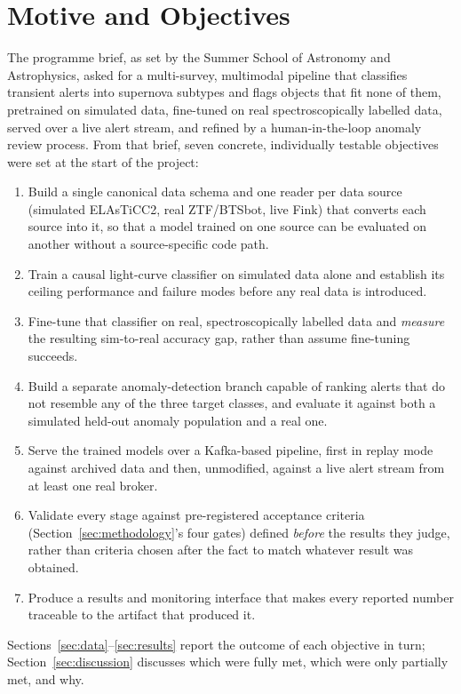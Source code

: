 \section{Motive and Objectives}
\label{sec:objectives}

The programme brief, as set by the Summer School of Astronomy and
Astrophysics, asked for a multi-survey, multimodal pipeline that classifies
transient alerts into supernova subtypes and flags objects that fit none of
them, pretrained on simulated data, fine-tuned on real spectroscopically
labelled data, served over a live alert stream, and refined by a
human-in-the-loop anomaly review process. From that brief, seven concrete,
individually testable objectives were set at the start of the project:

\begin{enumerate}
  \item Build a single canonical data schema and one reader per data source
    (simulated ELAsTiCC2, real ZTF/BTSbot, live Fink) that converts each
    source into it, so that a model trained on one source can be evaluated
    on another without a source-specific code path.
  \item Train a causal light-curve classifier on simulated data alone and
    establish its ceiling performance and failure modes before any real
    data is introduced.
  \item Fine-tune that classifier on real, spectroscopically labelled data
    and \emph{measure} the resulting sim-to-real accuracy gap, rather than
    assume fine-tuning succeeds.
  \item Build a separate anomaly-detection branch capable of ranking alerts
    that do not resemble any of the three target classes, and evaluate it
    against both a simulated held-out anomaly population and a real one.
  \item Serve the trained models over a Kafka-based pipeline, first in
    replay mode against archived data and then, unmodified, against a live
    alert stream from at least one real broker.
  \item Validate every stage against pre-registered acceptance criteria
    (Section~\ref{sec:methodology}'s four gates) defined \emph{before} the
    results they judge, rather than criteria chosen after the fact to match
    whatever result was obtained.
  \item Produce a results and monitoring interface that makes every reported
    number traceable to the artifact that produced it.
\end{enumerate}

Sections~\ref{sec:data}--\ref{sec:results} report the outcome of each
objective in turn; Section~\ref{sec:discussion} discusses which were fully
met, which were only partially met, and why.
